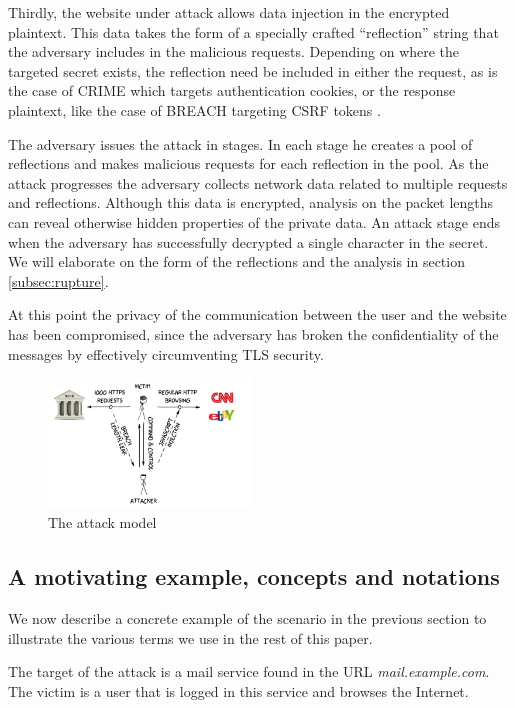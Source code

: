 Thirdly, the website under attack allows data injection in the encrypted
plaintext. This data takes the form of a specially crafted ``reflection'' string
that the adversary includes in the malicious requests. Depending on where the
targeted secret exists, the reflection need be included in either the
request, as is the case of CRIME which targets authentication cookies, or the
response plaintext, like the case of BREACH targeting CSRF tokens
\cite{de2011automatic}.

The adversary issues the attack in stages. In each stage he creates a pool of
reflections and makes malicious requests for each reflection in the pool.  As
the attack progresses the adversary collects network data related to multiple
requests and reflections.  Although this data is encrypted, analysis on the
packet lengths can reveal otherwise hidden properties of the private data.  An
attack stage ends when the adversary has successfully decrypted a single
character in the secret. We will elaborate on the form of the reflections and
the analysis in section \ref{subsec:rupture}.

At this point the privacy of the communication between the user and the website
has been compromised, since the adversary has broken the confidentiality of the messages
by effectively circumventing TLS security.

    \begin{figure}[thpb]
        \centering
            \includegraphics[width=0.48\textwidth]{figures/attack_model.png}
        \caption{The attack model}
        \label{fig:attack_model}
    \end{figure}

\subsection{A motivating example, concepts and notations}\label{subsec:terms}
We now describe a concrete example of the scenario in the previous section to
illustrate the various terms we use in the rest of this paper.

The target of the attack is a mail service found in the URL
\textit{mail.example.com}. The victim is a user that is logged in this service
and browses the Internet.

